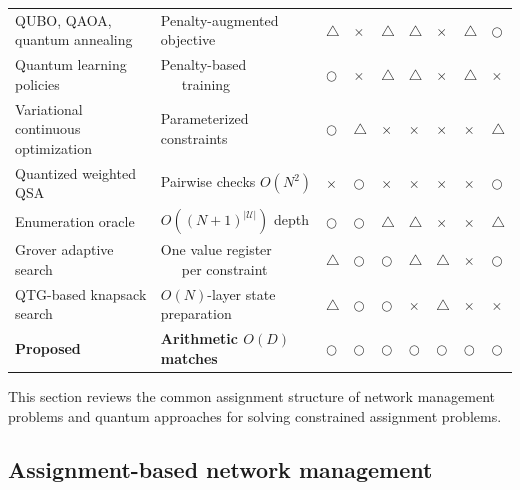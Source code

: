 \documentclass[journal]{IEEEtran}
\begin{document}
{{{\begin{table}[!t]
\begin{tabular}{@{}M{2.7cm} M{2.3cm} M{1.55cm} M{1.55cm} M{1.8cm}
     M{1.55cm} M{1.7cm} M{1.55cm} M{1.55cm}@{}}
QUBO, QAOA, quantum annealing
 \cite{farhi2014,lucas2014,kadowaki1998,zhang2024tnse,wei2024tnse} &
Penalty-augmented objective &
$\triangle$ &
$\times$ &
$\triangle$ &
$\triangle$ &
$\times$ &
$\triangle$ &
$\bigcirc$ \\

Quantum learning policies
 \cite{narottama2022qnn,ansere2024qdrl,ansere2026tnse} &
Penalty-based ~~~training &
$\bigcirc$ &
$\times$ &
$\triangle$ &
$\triangle$ &
$\times$ &
$\triangle$ &
$\times$ \\

Variational continuous optimization
 \cite{zhang2024beamforming,sharma2026tnse} &
Parameterized constraints &
$\bigcirc$ &
$\triangle$ &
$\times$ &
$\times$ &
$\times$ &
$\times$ &
$\triangle$ \\

Quantized weighted QSA
 \cite{seo2022} &
Pairwise checks $O(N^2)$ &
$\times$ &
$\bigcirc$ &
$\times$ &
$\times$ &
$\times$ &
$\times$ &
$\bigcirc$ \\

Enumeration oracle
 \cite{jang2025cqf} &
$O((N+1)^{|\mathcal{U}|})$ depth &
$\bigcirc$ &
$\bigcirc$ &
$\triangle$ &
$\triangle$ &
$\times$ &
$\times$ &
$\triangle$ \\

Grover adaptive search
 \cite{gilliam2021gas,fujiwara2025gas} &
One value register ~~~per constraint &
$\triangle$ &
$\bigcirc$ &
$\bigcirc$ &
$\triangle$ &
$\triangle$ &
$\times$ &
$\bigcirc$ \\

QTG-based knapsack search
 \cite{wilkening2025qtg,wilkening2025qkp} &
$O(N)$-layer state preparation &
$\triangle$ &
$\bigcirc$ &
$\bigcirc$ &
$\times$ &
$\triangle$ &
$\times$ &
$\times$ \\

\textbf{Proposed} &
\textbf{Arithmetic \qquad $O(D)$ matches} &
$\bigcirc$ &
$\bigcirc$ &
$\bigcirc$ &
$\bigcirc$ &
$\bigcirc$ &
$\bigcirc$ &
$\bigcirc$ \\

\bottomrule
\end{tabular}
\end{table}
}

This section reviews the common assignment structure of network management problems and quantum approaches for solving constrained assignment problems.

\vspace{-3mm}
\subsection{Assignment-based network management}
\label{sec:bg-assignment}

}}
\end{document}
